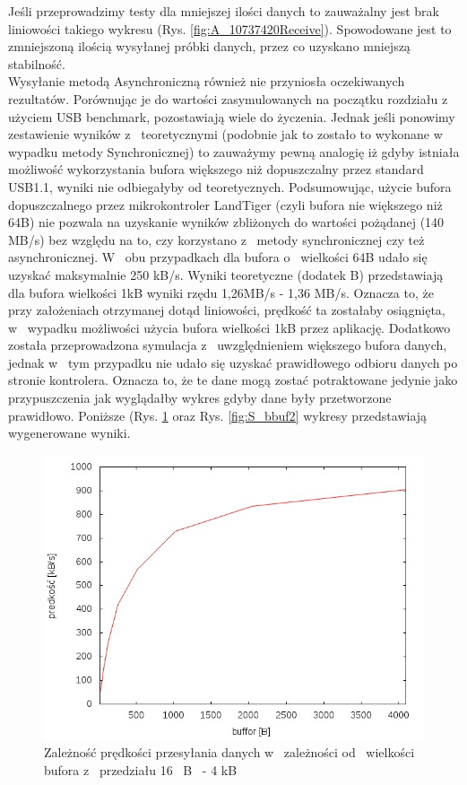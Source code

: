 \documentclass{BscUS}
\begin{document}
\noindent Jeśli przeprowadzimy testy dla mniejszej ilości danych to zauważalny jest brak liniowości takiego wykresu (Rys. \ref{fig:A_10737420Receive}). Spowodowane jest to zmniejszoną ilością wysyłanej próbki danych, przez co uzyskano mniejszą stabilność. \\
\indent Wysyłanie metodą Asynchroniczną również nie przyniosła oczekiwanych rezultatów. Porównując je do wartości zasymulowanych na początku rozdziału z~ użyciem USB benchmark, pozostawiają wiele do życzenia. Jednak jeśli ponowimy zestawienie wyników z~ teoretycznymi (podobnie jak to zostało to wykonane w~ wypadku metody Synchronicznej) to zauważymy pewną analogię iż gdyby istniała możliwość wykorzystania bufora większego niż dopuszczalny przez standard USB1.1, wyniki nie odbiegałyby od teoretycznych.
\indent Podsumowując, użycie bufora dopuszczalnego przez mikrokontroler LandTiger (czyli bufora nie większego niż 64B) nie pozwala na uzyskanie wyników zbliżonych do wartości pożądanej (140 MB/s) bez względu na to, czy korzystano z~ metody synchronicznej czy też asynchronicznej. W~ obu przypadkach dla bufora o~ wielkości 64B udało się uzyskać maksymalnie 250 kB/s. Wyniki teoretyczne (dodatek B) przedstawiają dla bufora wielkości 1kB wyniki rzędu 1,26MB/s - 1,36 MB/s. Oznacza to, że przy założeniach otrzymanej dotąd liniowości, prędkość ta zostałaby osiągnięta, w~ wypadku możliwości użycia bufora wielkości 1kB przez aplikację.
\newline
\noindent Dodatkowo została przeprowadzona symulacja z~ uwzględnieniem większego bufora danych, jednak w~ tym przypadku nie udało się uzyskać prawidłowego odbioru danych  po stronie kontrolera. Oznacza to, że te dane mogą zostać potraktowane jedynie jako przypuszczenia jak wyglądałby wykres gdyby dane były przetworzone prawidłowo. Poniższe (Rys. \ref{fig:S_bbuf1} oraz Rys. \ref{fig:S_bbuf2} wykresy przedstawiają wygenerowane wyniki.
\begin{figure}[H]
{
\centering
\captionsetup{justification=centering}
\includegraphics[width=1\textwidth]{./img/S_bbuf1}
\caption{Zależność prędkości przesyłania danych w~ zależności od~ wielkości bufora z~ przedziału 16~ B~ - 4 kB~}
\label{fig:S_bbuf1}
}
\end{figure}
\end{document}

